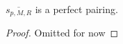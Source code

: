 \begin{lemma}
  \label{lm:intersection-pairing-is-perfect-pairing}
  $\overline{s_{p,M,R}}$ is a perfect pairing.
\end{lemma}
\begin{proof}
  Omitted for now
\end{proof}
